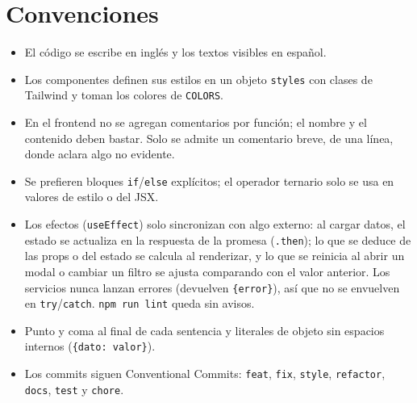 \documentclass[11pt,letterpaper]{article}
\newcommand{\code}[1]{\nolinkurl{#1}}
\begin{document}
\section{Convenciones}
\begin{itemize}
  \item El código se escribe en inglés y los textos visibles en español.
  \item Los componentes definen sus estilos en un objeto \code{styles} con clases de Tailwind y toman los colores de \code{COLORS}.
  \item En el frontend no se agregan comentarios por función; el nombre y el contenido deben bastar. Solo se admite un comentario breve, de una línea, donde aclara algo no evidente.
  \item Se prefieren bloques \code{if}/\code{else} explícitos; el operador ternario solo se usa en valores de estilo o del JSX.
  \item Los efectos (\code{useEffect}) solo sincronizan con algo externo: al cargar datos, el estado se actualiza en la respuesta de la promesa (\code{.then}); lo que se deduce de las props o del estado se calcula al renderizar, y lo que se reinicia al abrir un modal o cambiar un filtro se ajusta comparando con el valor anterior. Los servicios nunca lanzan errores (devuelven \code{\{error\}}), así que no se envuelven en \code{try}/\code{catch}. \code{npm run lint} queda sin avisos.
  \item Punto y coma al final de cada sentencia y literales de objeto sin espacios internos (\texttt{\{dato: valor\}}).
  \item Los commits siguen Conventional Commits: \code{feat}, \code{fix}, \code{style}, \code{refactor}, \code{docs}, \code{test} y \code{chore}.
\end{itemize}
\end{document}
